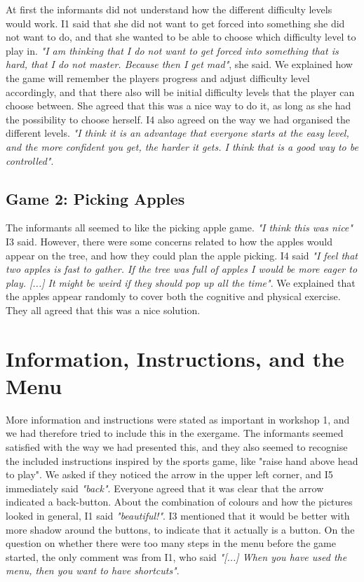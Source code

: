 At first the informants did not understand how the different difficulty levels would work. I1 said that she did not want to get forced into something she did not want to do, and that she wanted to be able to choose which difficulty level to play in. \emph{"I am thinking that I do not want to get forced into something that is hard, that I do not master. Because then I get mad"}, she said. We explained how the game will remember the players progress and adjust difficulty level accordingly, and that there also will be initial difficulty levels that the player can choose between. She agreed that this was a nice way to do it, as long as she had the possibility to choose herself. I4 also agreed on the way we had organised the different levels. \emph{"I think it is an advantage that everyone starts at the easy level, and the more confident you get, the harder it gets. I think that is a good way to be controlled"}.

\subsection{Game 2: Picking Apples}

The informants all seemed to like the picking apple game. \emph{"I think this was nice"} I3 said. However, there were some concerns related to how the apples would appear on the tree, and how they could plan the apple picking. I4 said \emph{"I feel that two apples is fast to gather. If the tree was full of apples I would be more eager to play. [...] It might be weird if they should pop up all the time"}. We explained that the apples appear randomly to cover both the cognitive and physical exercise. They all agreed that this was a nice solution. 


\section{Information, Instructions, and the Menu}

More information and instructions were stated as important in workshop 1, and we had therefore tried to include this in the exergame. The informants seemed satisfied with the way we had presented this, and they also seemed to recognise the included instructions inspired by the sports game, like "raise hand above head to play". We asked if they noticed the arrow in the upper left corner, and I5 immediately said \emph{"back"}. Everyone agreed that it was clear that the arrow indicated a back-button. About the combination of colours and how the pictures looked in general, I1 said \emph{"beautiful!"}. I3 mentioned that it would be better with more shadow around the buttons, to indicate that it actually is a button. On the question on whether there were too many steps in the menu before the game started, the only comment was from I1, who said \emph{"[...] When you have used the menu, then you want to have shortcuts"}. 

